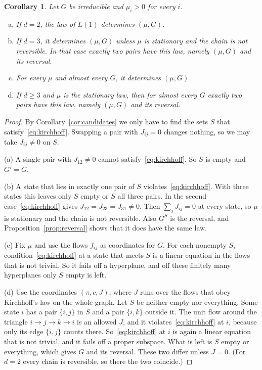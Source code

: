 \documentclass[11pt]{article}
\newtheorem{corollary}[theorem]{Corollary}
\theoremstyle{definition}
\theoremstyle{remark}
\begin{document}
\begin{corollary}\label{cor:generic}
Let $G$ be irreducible and $\mu_i>0$ for every $i$.
\begin{enumerate}[(a),itemsep=1pt]
\item If $d=2$, the law of $L(1)$ determines $(\mu,G)$.
\item If $d=3$, it determines $(\mu,G)$ unless $\mu$ is stationary and the chain
 is not reversible. In that case exactly two pairs have this law, namely
 $(\mu,G)$ and its reversal.
\item For every $\mu$ and almost every $G$, it determines $(\mu,G)$.
\item If $d\ge3$ and $\mu$ is the stationary law, then for almost every $G$
 exactly two pairs have this law, namely $(\mu,G)$ and its reversal.
\end{enumerate}
\end{corollary}
\begin{proof}
By Corollary~\ref{cor:candidates} we only have to find the sets $S$ that
satisfy~\eqref{eq:kirchhoff}. Swapping a pair with $J_{ij}=0$ changes nothing,
so we may take $J_{ij}\ne0$ on $S$.

(a) A single pair with $J_{12}\ne0$ cannot satisfy~\eqref{eq:kirchhoff}. So $S$
is empty and $G'=G$.

(b) A state that lies in exactly one pair of $S$
violates~\eqref{eq:kirchhoff}. With three states this leaves only $S$ empty or
$S$ all three pairs. In the second case~\eqref{eq:kirchhoff} gives
$J_{12}=J_{23}=J_{31}\ne0$. Then $\sum_jJ_{ij}=0$ at every state, so $\mu$ is
stationary and the chain is not reversible. Also $G^S$ is the reversal, and
Proposition~\ref{prop:reversal} shows that it does have the same law.

(c) Fix $\mu$ and use the flows $f_{ij}$ as coordinates for $G$. For each
nonempty $S$, condition~\eqref{eq:kirchhoff} at a state that meets $S$ is a
linear equation in the flows that is not trivial. So it fails off a hyperplane,
and off these finitely many hyperplanes only $S$ empty is left.

(d) Use the coordinates $(\pi,c,J)$, where $J$ runs over the flows that obey
Kirchhoff's law on the whole graph. Let $S$ be neither empty nor everything.
Some state $i$ has a pair $\{i,j\}$ in $S$ and a pair $\{i,k\}$ outside it. The
unit flow around the triangle $i\to j\to k\to i$ is an allowed $J$, and it
violates~\eqref{eq:kirchhoff} at $i$, because only its edge $\{i,j\}$ counts
there. So~\eqref{eq:kirchhoff} at $i$ is again a linear equation that is not
trivial, and it fails off a proper subspace. What is left is $S$ empty or
everything, which gives $G$ and its reversal. These two differ unless $J=0$.
(For $d=2$ every chain is reversible, so there the two coincide.)
\end{proof}
\end{document}
